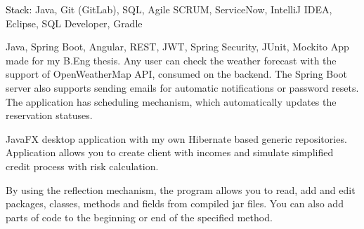 \documentclass[10pt,a4paper,ragged2e,withhyper]{altacv}
\begin{document}
\begin{paracol}{2}
\textcolor{black}{Stack:} Java, Git (GitLab), SQL, Agile SCRUM, ServiceNow, IntelliJ IDEA, Eclipse, SQL Developer, Gradle


{Java, Spring Boot, Angular, REST, JWT, Spring Security, JUnit, Mockito}{}{}
App made for my B.Eng thesis. Any user can check the weather forecast with the support of OpenWeatherMap API, consumed on the backend. 
The Spring Boot server also supports sending emails for automatic notifications or password resets. 
The application has scheduling mechanism, which automatically updates the reservation statuses.

\divider

JavaFX desktop application with my own Hibernate based generic repositories.
Application allows you to create client with incomes and simulate simplified credit process with risk calculation.

\divider

By using the reflection mechanism, the program allows you to read, add and edit 
packages, classes, methods and fields from compiled jar files. 
You can also add parts of code to the beginning or end of the specified method. 


\switchcolumn




\divider


\divider



\end{paracol}
\end{document}

